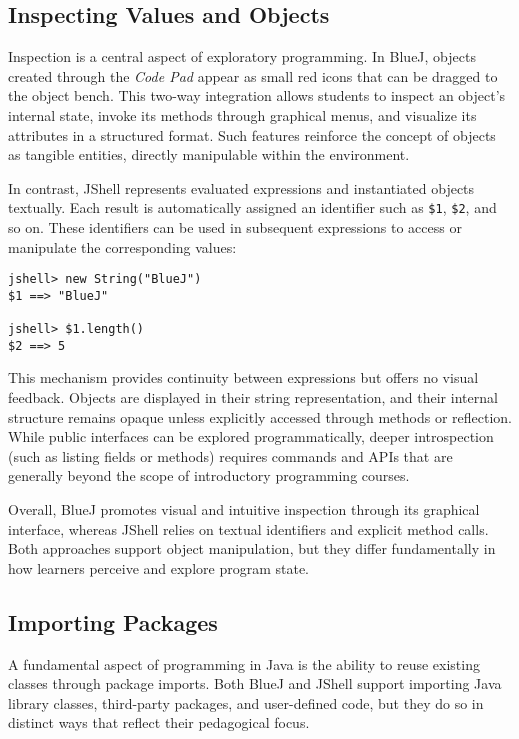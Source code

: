 \documentclass{article}
\begin{document}
\subsection{Inspecting Values and Objects}

Inspection is a central aspect of exploratory programming. In BlueJ, objects created through the \textit{Code Pad} appear as small red icons that can be dragged to the object bench. This two-way integration allows students to inspect an object’s internal state, invoke its methods through graphical menus, and visualize its attributes in a structured format. Such features reinforce the concept of objects as tangible entities, directly manipulable within the environment.

In contrast, JShell represents evaluated expressions and instantiated objects textually. Each result is automatically assigned an identifier such as \texttt{\$1}, \texttt{\$2}, and so on. These identifiers can be used in subsequent expressions to access or manipulate the corresponding values:

\begin{lstlisting}
jshell> new String("BlueJ")
$1 ==> "BlueJ"

jshell> $1.length()
$2 ==> 5
\end{lstlisting}

This mechanism provides continuity between expressions but offers no visual feedback. Objects are displayed in their string representation, and their internal structure remains opaque unless explicitly accessed through methods or reflection. While public interfaces can be explored programmatically, deeper introspection (such as listing fields or methods) requires commands and APIs that are generally beyond the scope of introductory programming courses.

Overall, BlueJ promotes visual and intuitive inspection through its graphical interface, whereas JShell relies on textual identifiers and explicit method calls. Both approaches support object manipulation, but they differ fundamentally in how learners perceive and explore program state.


\subsection{Importing Packages}

A fundamental aspect of programming in Java is the ability to reuse existing classes through package imports. Both BlueJ and JShell support importing Java library classes, third-party packages, and user-defined code, but they do so in distinct ways that reflect their pedagogical focus.
\end{document}
